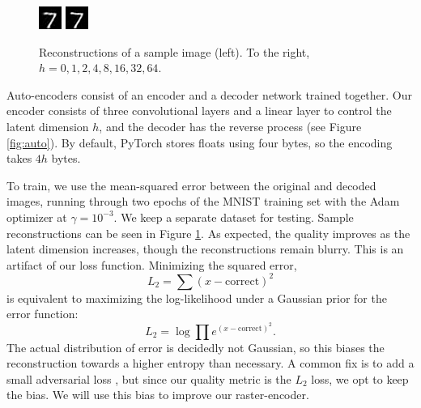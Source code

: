 \documentclass[11pt]{article}
\begin{document}
\begin{figure}
  \includegraphics[width=0.2\columnwidth]{diagrams/reconstructions/32.png}
  \includegraphics[width=0.2\columnwidth]{diagrams/reconstructions/64.png}
  \caption{Reconstructions of a sample image (left). To the right, $h=0, 1, 2, 4, 8, 16, 32, 64$.}
  \label{fig:recon}
\end{figure}

Auto-encoders consist of an encoder and a decoder network trained together. Our encoder consists of three convolutional layers and a linear layer to control the latent dimension $h$, and the decoder has the reverse process (see Figure \ref{fig:auto}). By default, PyTorch stores floats using four bytes, so the encoding takes $4h$ bytes.

To train, we use the mean-squared error between the original and decoded images, running through two epochs of the MNIST training set with the Adam optimizer at $\gamma=10^{-3}$. We keep a separate dataset for testing. Sample reconstructions can be seen in Figure \ref{fig:recon}. As expected, the quality improves as the latent dimension increases, though the reconstructions remain blurry. This is an artifact of our loss function. Minimizing the squared error,
$$L_2 = \sum (x-\mathrm{correct})^2$$
is equivalent to maximizing the log-likelihood under a Gaussian prior for the error function:
$$L_2 = \log\prod e^{(x-\mathrm{correct})^2}.$$
The actual distribution of error is decidedly not Gaussian, so this biases the reconstruction towards a higher entropy than necessary. A common fix is to add a small adversarial loss \citep{makhzani-2016-adversarial}, but since our quality metric is the $L_2$ loss, we opt to keep the bias. We will use this bias to improve our raster-encoder.
\end{document}
